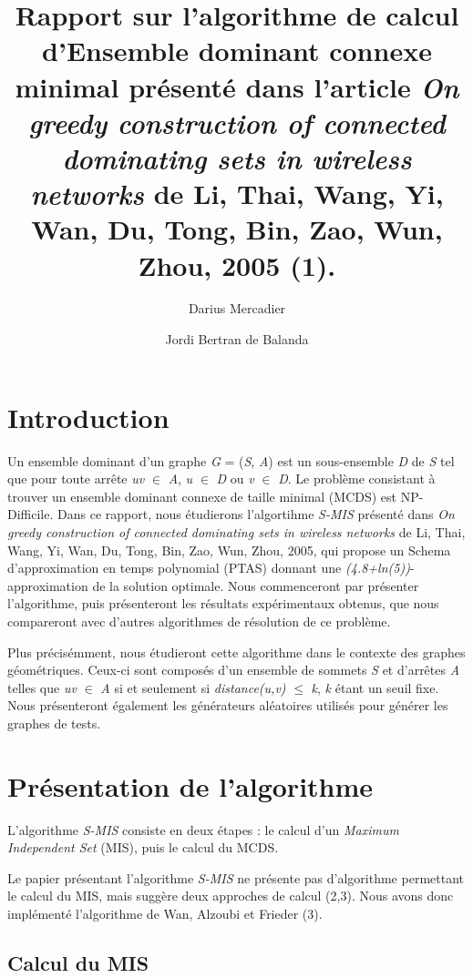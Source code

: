 \documentclass[]{report}
\title{Rapport sur l'algorithme de calcul d'Ensemble dominant connexe minimal
présenté dans l'article \emph{On greedy construction of connected
dominating sets in wireless networks} de Li, Thai, Wang, Yi, Wan, Du,
Tong, Bin, Zao, Wun, Zhou, 2005 (1).}
\author{Darius Mercadier \and Jordi Bertran de Balanda}
\date{}
\begin{document}
\maketitle

{
\setcounter{tocdepth}{2}
\tableofcontents
}
\newpage

\section{Introduction}\label{introduction}

Un ensemble dominant d'un graphe \emph{G} = (\emph{S}, \emph{A}) est un
sous-ensemble \emph{D} de \emph{S} tel que pour toute arrête \emph{uv}
\(\in\) \emph{A}, \emph{u} \(\in\) \emph{D} ou \emph{v} \(\in\)
\emph{D}. Le problème consistant à trouver un ensemble dominant connexe
de taille minimal (MCDS) est NP-Difficile. Dans ce rapport, nous
étudierons l'algortihme \emph{S-MIS} présenté dans \emph{On greedy
construction of connected dominating sets in wireless networks} de Li,
Thai, Wang, Yi, Wan, Du, Tong, Bin, Zao, Wun, Zhou, 2005, qui propose un
Schema d'approximation en temps polynomial (PTAS) donnant une
\emph{(4.8+ln(5))}-approximation de la solution optimale. Nous
commenceront par présenter l'algorithme, puis présenteront les résultats
expérimentaux obtenus, que nous compareront avec d'autres algorithmes de
résolution de ce problème.

Plus précisémment, nous étudieront cette algorithme dans le contexte des
graphes géométriques. Ceux-ci sont composés d'un ensemble de sommets
\emph{S} et d'arrêtes \emph{A} telles que \emph{uv} \(\in\) \emph{A} si
et seulement si \emph{distance(u,v)} \(\leq\) \emph{k}, \emph{k} étant
un seuil fixe. Nous présenteront également les générateurs aléatoires
utilisés pour générer les graphes de tests.

\section{Présentation de
l'algorithme}\label{pruxe9sentation-de-lalgorithme}

L'algorithme \emph{S-MIS} consiste en deux étapes : le calcul d'un
\emph{Maximum Independent Set} (MIS), puis le calcul du MCDS.

Le papier présentant l'algorithme \emph{S-MIS} ne présente pas
d'algorithme permettant le calcul du MIS, mais suggère deux approches de
calcul (2,3). Nous avons donc implémenté l'algorithme de Wan, Alzoubi et
Frieder (3).

\subsection{Calcul du MIS}\label{calcul-du-mis}
\end{document}
